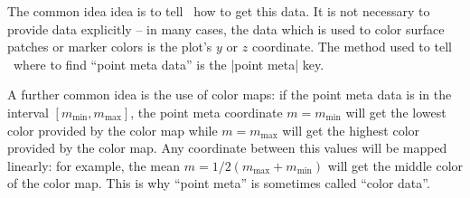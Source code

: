 The common idea idea is to tell \PGFPlots\ how to get this data. It is not necessary to provide data explicitly -- in many cases, the data which is used to color surface patches or marker colors is the plot's $y$ or $z$ coordinate. The method used to tell \PGFPlots\ where to find ``point meta data'' is the |point meta| key. 

A further common idea is the use of color maps: if the point meta data is in the interval $[m_{\text{min}},m_{\text{max}}]$, the point meta coordinate $m = m_{\text{min}}$ will get the lowest color provided by the color map while $m=m_{\text{max}}$ will get the highest color provided by the color map. Any coordinate between this values will be mapped linearly: for example, the mean $m = 1/2 (m_{\text{max}} + m_{\text{min}})$ will get the middle color of the color map. This is why ``point meta'' is sometimes called ``color data''.

\begin{codeexample}[]
\end{codeexample}

